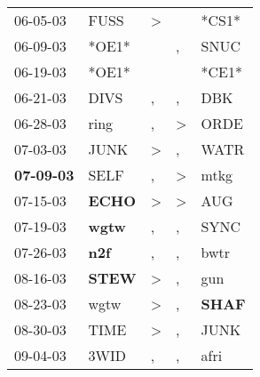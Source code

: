 \begin{supertabular}{p{0.07\textwidth}p{0.06\textwidth}p{0.02\textwidth}p{0.02\textwidth}p{0.06\textwidth}}
          06-05-03\textsuperscript{} &           FUSS\textsuperscript{} &     \textgreater &                  &                            *CS1* \\
          06-09-03\textsuperscript{} &                            *OE1* &                  &                , &           SNUC\textsuperscript{} \\
          06-19-03\textsuperscript{} &                            *OE1* &                  &                  &                            *CE1* \\
          06-21-03\textsuperscript{} &           DIVS\textsuperscript{} &                , &                , &            DBK\textsuperscript{} \\
          06-28-03\textsuperscript{} &           ring\textsuperscript{} &                , &     \textgreater &           ORDE\textsuperscript{} \\
          07-03-03\textsuperscript{} &           JUNK\textsuperscript{} &     \textgreater &                , &           WATR\textsuperscript{} \\
 \textbf{07-09-03\textsuperscript{}} &           SELF\textsuperscript{} &                , &     \textgreater &           mtkg\textsuperscript{} \\
          07-15-03\textsuperscript{} &  \textbf{ECHO\textsuperscript{}} &     \textgreater &     \textgreater &            AUG\textsuperscript{} \\
          07-19-03\textsuperscript{} &  \textbf{wgtw\textsuperscript{}} &                , &                , &           SYNC\textsuperscript{} \\
          07-26-03\textsuperscript{} &   \textbf{n2f\textsuperscript{}} &                , &                , &           bwtr\textsuperscript{} \\
          08-16-03\textsuperscript{} &  \textbf{STEW\textsuperscript{}} &     \textgreater &                , &            gun\textsuperscript{} \\
          08-23-03\textsuperscript{} &           wgtw\textsuperscript{} &     \textgreater &                , &  \textbf{SHAF\textsuperscript{}} \\
          08-30-03\textsuperscript{} &           TIME\textsuperscript{} &     \textgreater &                , &           JUNK\textsuperscript{} \\
          09-04-03\textsuperscript{} &           3WID\textsuperscript{} &                , &                , &           afri\textsuperscript{} \\

\end{supertabular}
